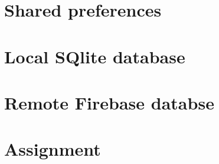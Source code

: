 \graphicspath{{./lab05/Images/}}


\maketocpage

\section{Shared preferences}
\section{Local SQlite database}
\section{Remote Firebase databse}
\section{Assignment}
